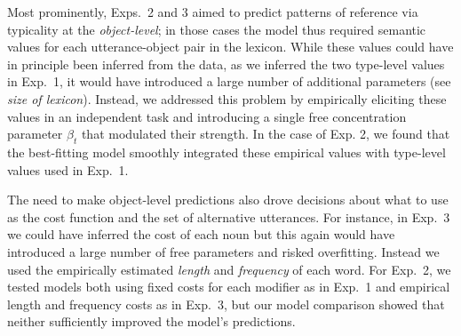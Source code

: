 \documentclass[11pt]{article}
\begin{document}
Most prominently, Exps.~2 and 3 aimed to predict patterns of reference via typicality at the \emph{object-level}; in those cases the model thus required semantic values for each utterance-object pair in the lexicon.
While these values could have in principle been inferred from the data, as we inferred the two type-level values in Exp.~1, it would have introduced a large number of additional parameters (see \emph{size of lexicon}). 
Instead, we addressed this problem by empirically eliciting these values in an independent task and introducing a single free concentration parameter $\beta_t$ that modulated their strength.
In the case of Exp. 2, we found that the best-fitting model smoothly integrated these empirical values with type-level values used in Exp.~1.

The need to make object-level predictions also drove decisions about what to use as the cost function and the set of alternative utterances.
For instance, in Exp.~3 we could have inferred the cost of each noun but this again would have introduced a large number of free parameters and risked overfitting. 
Instead we used the empirically estimated \emph{length} and \emph{frequency} of each word. 
For Exp.~2, we tested models both using fixed costs for each modifier as in Exp.~1 and empirical length and frequency costs as in Exp.~3, but our model comparison showed that neither sufficiently improved the model's predictions.
\end{document}
